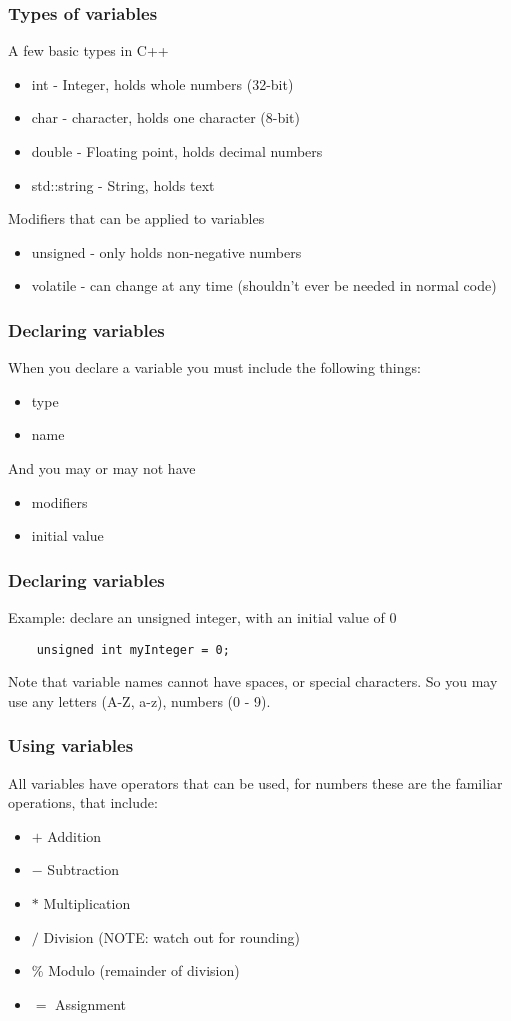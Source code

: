 \documentclass{beamer}
\begin{document}
\begin{frame}
	\frametitle{Types of variables}
	A few basic types in C++
	\begin{itemize}
		\item int - Integer, holds whole numbers (32-bit)
		\item char - character, holds one character (8-bit)
		\item double - Floating point, holds decimal numbers
		\item std::string - String, holds text
	\end{itemize}
	Modifiers that can be applied to variables
	\begin{itemize}
		\item unsigned - only holds non-negative numbers
		\item volatile - can change at any time (shouldn't ever be needed in normal code)
	\end{itemize}
\end{frame}

\begin{frame}
	\frametitle{Declaring variables}
	When you declare a variable you must include the following things:
	\begin{itemize}
		\item type
		\item name
	\end{itemize}
	And you may or may not have
	\begin{itemize}
		\item modifiers
		\item initial value
	\end{itemize}
\end{frame}

\begin{frame}[fragile]
	\frametitle{Declaring variables}
	Example: declare an unsigned integer, with an initial value of 0
	\begin{lstlisting}
	unsigned int myInteger = 0;
	\end{lstlisting}
	Note that variable names cannot have spaces, or special characters. 
	So you may use any letters (A-Z, a-z), numbers (0 - 9).
\end{frame}

\begin{frame}
	\frametitle{Using variables}
	All variables have operators that can be used, for numbers these 
	are the familiar operations, that include:
	\begin{itemize}
		\item $+$ Addition
		\item $-$ Subtraction
		\item $*$ Multiplication
		\item $/$ Division (NOTE: watch out for rounding)
		\item $\%$ Modulo (remainder of division)
		\item $=$ Assignment
	\end{itemize}
\end{frame}
\end{document}
